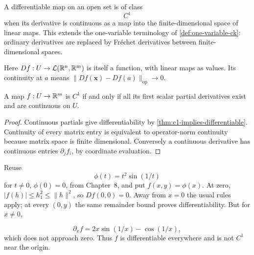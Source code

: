 \begin{definition}[Class $C^1$]
A differentiable map on an open set is of class
\[
C^1
\]
when its derivative is continuous as a map into the finite-dimensional space
of linear maps. This extends the one-variable terminology of
\cref{def:one-variable-ck}: ordinary derivatives are replaced by Fr\'echet
derivatives between finite-dimensional spaces.
\end{definition}

Here $Df:U\to\mathcal L(\mathbb{R}^n,\mathbb{R}^m)$ is itself a function, with
linear maps as values. Its continuity at $a$ means
$\|Df(\mathbf{x})-Df(a)\|_{\mathrm{op}}\to0$.
\begin{proposition}
A map $f:U\to\mathbb{R}^m$ is $C^1$ if and only if all its first scalar
partial derivatives exist and are continuous on $U$.
\end{proposition}
\begin{proof}
Continuous partials give differentiability by
\cref{thm:c1-implies-differentiable}. Continuity of every matrix entry is
equivalent to operator-norm continuity because matrix space is finite
dimensional. Conversely a continuous derivative has continuous entries
$\partial_j f_i$, by coordinate evaluation.
\end{proof}
\begin{example}
Reuse
\[
\phi(t)=t^2\sin(1/t)
\]
 for $t\ne0$, $\phi(0)=0$, from Chapter~8,
and put $f(x,y)=\phi(x)$. At zero,
$|f(h)|\leq h_1^2\leq\|h\|^2$, so $Df(0,0)=0$.
Away from $x=0$ the usual rules apply; at every $(0,y)$ the same remainder
bound proves differentiability. But for $x\ne0$,

\[
\partial_xf=2x\sin(1/x)-\cos(1/x),
\]
 which does not approach zero.
Thus $f$ is differentiable everywhere and is not $C^1$ near the origin.
\end{example}





